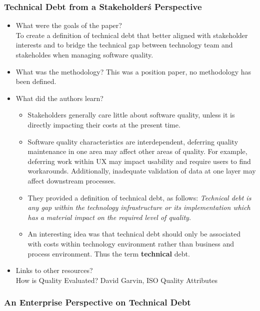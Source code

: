 \documentclass{mprop}
\begin{document}
\subsubsection{Technical Debt from a Stakeholder\'s Perspective} \cite{Theodoropoulos2011}

\begin{itemize}
	\item What were the goals of the paper? \\
		To create a definition of technical debt that better aligned with stakeholder interests and to bridge the technical gap between technology team and stakeholdes when managing software quality.
	\item What was the methodology?
		This was a position paper, no methodology has been defined.
	\item What did the authors learn?
		\begin{itemize}
			\item Stakeholders generally care little about software quality, unless it is directly impacting their costs at the present time.
			\item Software quality characteristics are interdependent, deferring quality maintenance in one area may affect other areas of quality. For example, deferring work within UX may impact usability and require users to find workarounds. Additionally, inadequate validation of data at one layer may affect downstream processes.
			\item They provided a definition of technical debt, as follows: \textit{Technical debt is any gap within the technology infrastructure or its implementation which has a material impact on the required level of quality.}
			\item An interesting idea was that technical debt should only be associated with costs within technology environment rather than business and process environment. Thus the term \textbf{technical} debt. 
			\end{itemize}
	\item Links to other resources? \\
		How is Quality Evaluated? David Garvin, ISO Quality Attributes
\end{itemize}

\subsubsection{An Enterprise Perspective on Technical Debt} \cite{Klinger2011}
\end{document}
